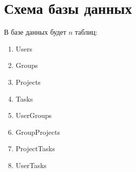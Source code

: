 \documentclass[12pt,a4paper,notitlepage]{article}
\begin{document}
\section{Схема базы данных}

В базе данных будет $n$ таблиц:
\begin{enumerate}
\item Users
\item Groups
\item Projects
\item Tasks
\item UserGroups
\item GroupProjects
\item ProjectTasks
\item UserTasks
\end{enumerate}
\end{document}
